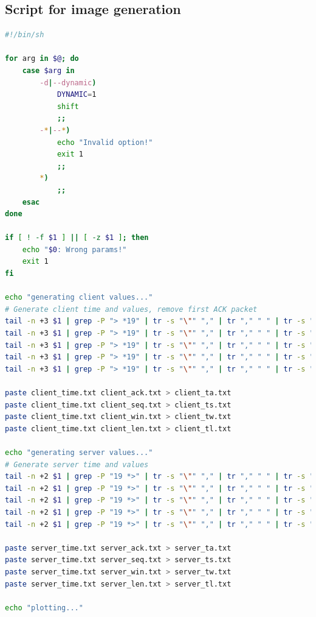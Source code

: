 \documentclass{exam}
\begin{document}
\subsection{Script for image generation}
\begin{lstlisting}[language=bash]
#!/bin/sh

for arg in $@; do
	case $arg in
		-d|--dynamic)
			DYNAMIC=1
			shift
			;;
		-*|--*)
			echo "Invalid option!"
			exit 1
			;;
		*)
			;;
	esac
done

if [ ! -f $1 ] || [ -z $1 ]; then
	echo "$0: Wrong params!"
	exit 1
fi

echo "generating client values..."
# Generate client time and values, remove first ACK packet
tail -n +3 $1 | grep -P "> *19" | tr -s "\"" "," | tr "," " " | tr -s " " | cut -d " " -f 3 > client_time.txt
tail -n +3 $1 | grep -P "> *19" | tr -s "\"" "," | tr "," " " | tr -s " " | grep -oP "(?<=Ack=)([^ ]*)" > client_ack.txt
tail -n +3 $1 | grep -P "> *19" | tr -s "\"" "," | tr "," " " | tr -s " " | grep -oP "(?<=Seq=)([^ ]*)" > client_seq.txt
tail -n +3 $1 | grep -P "> *19" | tr -s "\"" "," | tr "," " " | tr -s " " | grep -oP "(?<=Len=)([^ ]*)" > client_len.txt
tail -n +3 $1 | grep -P "> *19" | tr -s "\"" "," | tr "," " " | tr -s " " | grep -oP "(?<=Win=)([^ ]*)" > client_win.txt

paste client_time.txt client_ack.txt > client_ta.txt
paste client_time.txt client_seq.txt > client_ts.txt
paste client_time.txt client_win.txt > client_tw.txt
paste client_time.txt client_len.txt > client_tl.txt

echo "generating server values..."
# Generate server time and values
tail -n +2 $1 | grep -P "19 *>" | tr -s "\"" "," | tr "," " " | tr -s " " | cut -d " " -f 3 > server_time.txt
tail -n +2 $1 | grep -P "19 *>" | tr -s "\"" "," | tr "," " " | tr -s " " | grep -oP "(?<=Ack=)([^ ]*)" > server_ack.txt
tail -n +2 $1 | grep -P "19 *>" | tr -s "\"" "," | tr "," " " | tr -s " " | grep -oP "(?<=Seq=)([^ ]*)" > server_seq.txt
tail -n +2 $1 | grep -P "19 *>" | tr -s "\"" "," | tr "," " " | tr -s " " | grep -oP "(?<=Len=)([^ ]*)" > server_len.txt
tail -n +2 $1 | grep -P "19 *>" | tr -s "\"" "," | tr "," " " | tr -s " " | grep -oP "(?<=Win=)([^ ]*)" > server_win.txt

paste server_time.txt server_ack.txt > server_ta.txt
paste server_time.txt server_seq.txt > server_ts.txt
paste server_time.txt server_win.txt > server_tw.txt
paste server_time.txt server_len.txt > server_tl.txt

echo "plotting..."


\end{lstlisting}
\end{document}

